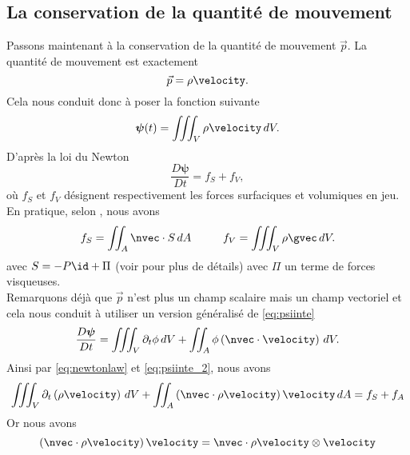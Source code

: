 \subsection{La conservation de la quantité de mouvement}
Passons maintenant à la conservation de la quantité de mouvement $\vec{p}$. La quantité de mouvement est exactement
\begin{equation}
	\vec{p} = \rho \velocity. \label{eq:qtmouv}
\end{equation}
Cela nous conduit donc à poser la fonction suivante
\[ \boldsymbol{\psi} (t) = \iiint_V \rho\velocity\,d V.\]
D'après la loi du Newton 
\begin{equation}
	\frac{D \boldsymbol{\psi}}{D t} = f_S + f_V, \label{eq:newtonlaw}
\end{equation}
où $f_S$ et $f_V$ désignent respectivement les forces surfaciques et volumiques en jeu.\\
En pratique, selon \citet{toro_riemann_2009}, nous avons
\begin{equation}
	f_S = \iint_A \nvec \cdot S\,d A \hspace{1cm} f_V = \iiint_V \rho \gvec \, dV. \label{eq:forces}
\end{equation}
avec $S = -P\id + \Pi$ (voir \citet{toro_riemann_2009} pour plus de détails) avec $\Pi$ un terme de forces visqueuses.\\
Remarquons déjà que $\vec{p}$ n'est plus un champ scalaire mais un champ vectoriel et cela nous conduit à utiliser un version généralisé de \eqref{eq:psiinte} 
\begin{equation}
	\frac{D \boldsymbol{\psi}}{D t} = \iiint_V \partial_t \phi \, dV + \iint_A \phi \left(\nvec \cdot \velocity \right)\, d V. \label{eq:psiinte_2}
\end{equation}
Ainsi par \eqref{eq:newtonlaw} et \eqref{eq:psiinte_2}, nous avons
\begin{equation}
	\iiint_V \partial_t \left(\rho\velocity\right)\, d V + \iint_A \left(\nvec\cdot\rho\velocity\right)\velocity\,d A = f_S + f_A
\end{equation}
Or nous avons
\begin{equation}
	\left(\nvec\cdot \rho\velocity\right)\velocity = \nvec \cdot \rho\velocity \otimes \velocity \label{eq:identitytensorvelocity}
\end{equation}
